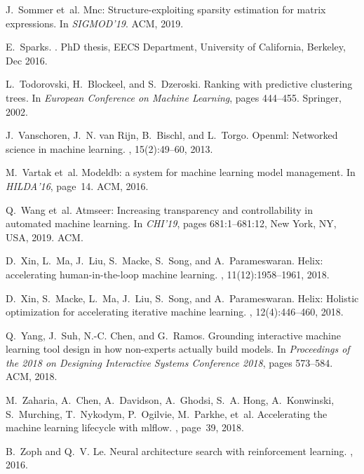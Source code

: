 \documentclass[11pt,dvipdfmx]{article}
\begin{document}
{\begin{thebibliography}{10}
J.~Sommer et~al.
\newblock Mnc: Structure-exploiting sparsity estimation for matrix expressions.
\newblock In {\em SIGMOD'19}. ACM, 2019.

E.~Sparks.
.
\newblock PhD thesis, EECS Department, University of California, Berkeley, Dec
  2016.

L.~Todorovski, H.~Blockeel, and S.~Dzeroski.
\newblock Ranking with predictive clustering trees.
\newblock In {\em European Conference on Machine Learning}, pages 444--455.
  Springer, 2002.

J.~Vanschoren, J.~N. van Rijn, B.~Bischl, and L.~Torgo.
\newblock Openml: Networked science in machine learning.
, 15(2):49--60, 2013.

M.~Vartak et~al.
\newblock Modeldb: a system for machine learning model management.
\newblock In {\em HILDA'16}, page~14. ACM, 2016.

Q.~Wang et~al.
\newblock Atmseer: Increasing transparency and controllability in automated
  machine learning.
\newblock In {\em CHI'19}, pages 681:1--681:12, New York, NY, USA, 2019. ACM.

D.~Xin, L.~Ma, J.~Liu, S.~Macke, S.~Song, and A.~Parameswaran.
\newblock Helix: accelerating human-in-the-loop machine learning.
, 11(12):1958--1961, 2018.

D.~Xin, S.~Macke, L.~Ma, J.~Liu, S.~Song, and A.~Parameswaran.
\newblock Helix: Holistic optimization for accelerating iterative machine
  learning.
, 12(4):446--460, 2018.

Q.~Yang, J.~Suh, N.-C. Chen, and G.~Ramos.
\newblock Grounding interactive machine learning tool design in how non-experts
  actually build models.
\newblock In {\em Proceedings of the 2018 on Designing Interactive Systems
  Conference 2018}, pages 573--584. ACM, 2018.

M.~Zaharia, A.~Chen, A.~Davidson, A.~Ghodsi, S.~A. Hong, A.~Konwinski,
  S.~Murching, T.~Nykodym, P.~Ogilvie, M.~Parkhe, et~al.
\newblock Accelerating the machine learning lifecycle with mlflow.
, page~39, 2018.

B.~Zoph and Q.~V. Le.
\newblock Neural architecture search with reinforcement learning.
, 2016.

\end{thebibliography}
}
\end{document}
